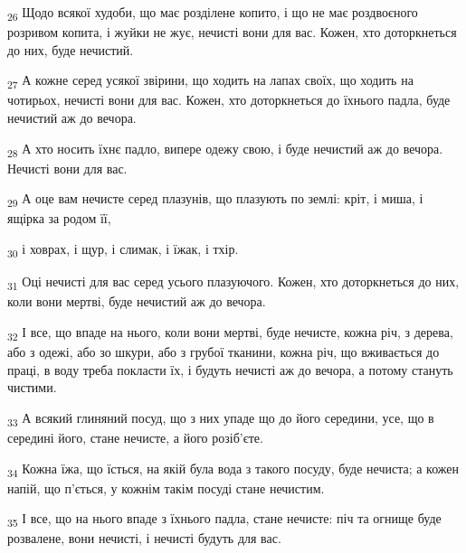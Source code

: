 \begin{tcolorbox}
\textsubscript{26} Щодо всякої худоби, що має розділене копито, і що не має роздвоєного розривом копита, і жуйки не жує, нечисті вони для вас. Кожен, хто доторкнеться до них, буде нечистий.
\end{tcolorbox}
\begin{tcolorbox}
\textsubscript{27} А кожне серед усякої звірини, що ходить на лапах своїх, що ходить на чотирьох, нечисті вони для вас. Кожен, хто доторкнеться до їхнього падла, буде нечистий аж до вечора.
\end{tcolorbox}
\begin{tcolorbox}
\textsubscript{28} А хто носить їхнє падло, випере одежу свою, і буде нечистий аж до вечора. Нечисті вони для вас.
\end{tcolorbox}
\begin{tcolorbox}
\textsubscript{29} А оце вам нечисте серед плазунів, що плазують по землі: кріт, і миша, і ящірка за родом її,
\end{tcolorbox}
\begin{tcolorbox}
\textsubscript{30} і ховрах, і щур, і слимак, і їжак, і тхір.
\end{tcolorbox}
\begin{tcolorbox}
\textsubscript{31} Оці нечисті для вас серед усього плазуючого. Кожен, хто доторкнеться до них, коли вони мертві, буде нечистий аж до вечора.
\end{tcolorbox}
\begin{tcolorbox}
\textsubscript{32} І все, що впаде на нього, коли вони мертві, буде нечисте, кожна річ, з дерева, або з одежі, або зо шкури, або з грубої тканини, кожна річ, що вживається до праці, в воду треба покласти їх, і будуть нечисті аж до вечора, а потому стануть чистими.
\end{tcolorbox}
\begin{tcolorbox}
\textsubscript{33} А всякий глиняний посуд, що з них упаде що до його середини, усе, що в середині його, стане нечисте, а його розіб'єте.
\end{tcolorbox}
\begin{tcolorbox}
\textsubscript{34} Кожна їжа, що їсться, на якій була вода з такого посуду, буде нечиста; а кожен напій, що п'ється, у кожнім такім посуді стане нечистим.
\end{tcolorbox}
\begin{tcolorbox}
\textsubscript{35} І все, що на нього впаде з їхнього падла, стане нечисте: піч та огнище буде розвалене, вони нечисті, і нечисті будуть для вас.
\end{tcolorbox}
